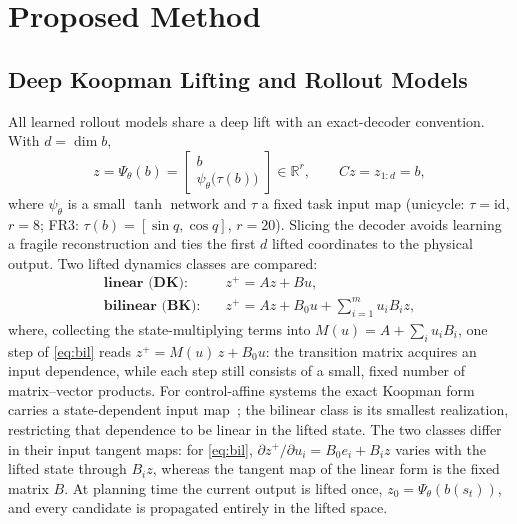 \documentclass[lettersize,journal]{IEEEtran}
\theoremstyle{remark}
\begin{document}
\section{Proposed Method}\label{sec:method}

\subsection{Deep Koopman Lifting and Rollout Models}\label{subsec:models}

All learned rollout models share a deep lift with an exact-decoder
convention. With $d = \dim b$,
\begin{equation}
z = \Psi_\theta(b) =
\begin{bmatrix} b \\ \psi_\theta\big(\tau(b)\big) \end{bmatrix}
\in \mathbb{R}^{r},
\qquad
C z = z_{1:d} = b,
\label{eq:lift}
\end{equation}
where $\psi_\theta$ is a small $\tanh$ network and $\tau$ a fixed task
input map (unicycle: $\tau = \mathrm{id}$, $r = 8$; FR3:
$\tau(b) = [\sin q, \cos q]$, $r = 20$). Slicing the decoder avoids
learning a fragile reconstruction and ties the first $d$ lifted coordinates
to the physical output. Two lifted dynamics classes are compared:
\begin{align}
\textbf{linear (DK):}\quad
& z^{+} = A z + B u ,
\label{eq:lin}\\[2pt]
\textbf{bilinear (BK):}\quad
& z^{+} = A z + B_0 u + \sum_{i=1}^{m} u_i B_i z ,
\label{eq:bil}
\end{align}
where, collecting the state-multiplying terms into
$M(u) = A + \sum_i u_i B_i$, one step of \eqref{eq:bil} reads
$z^{+} = M(u)\, z + B_0 u$: the transition matrix acquires an input
dependence, while each step still consists of a small, fixed number of
matrix--vector products. For control-affine systems the exact Koopman
form carries a state-dependent input map~\cite{iacob2024}; the bilinear
class is its smallest realization, restricting that dependence to be
linear in the lifted state. The two classes differ in their input
tangent maps: for \eqref{eq:bil},
$\partial z^{+} / \partial u_i = B_0 e_i + B_i z$ varies with the
lifted state through $B_i z$, whereas the tangent map of the linear
form is the fixed matrix $B$. At planning time the
current output is lifted once, $z_0 = \Psi_\theta(b(s_t))$, and every
candidate is propagated entirely in the lifted space.
\end{document}
